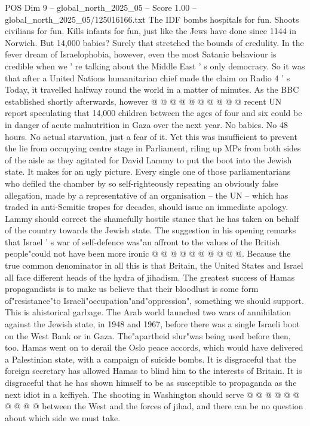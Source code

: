 \begin{textsample}{POS Dim 9 – global\_north\_2025\_05 – Score 1.00 – global\_north\_2025\_05/125016166.txt}
The IDF bombs hospitals for fun.
Shoots civilians for fun.
Kills infants for fun, just like the Jews have done since 1144 in Norwich.
But 14,000 babies?
Surely that stretched the bounds of credulity.
In the fever dream of Israelophobia, however, even the most Satanic behaviour is credible when we ' re talking about the Middle East ' s only democracy.
So it was that after a United Nations humanitarian chief made the claim on Radio 4 ' s Today, it travelled halfway round the world in a matter of minutes.
As the BBC established shortly afterwards, however @ @ @ @ @ @ @ @ @ @ recent UN report speculating that 14,000 children between the ages of four and six could be in danger of acute malnutrition in Gaza over the next year.
No babies.
No 48 hours.
No actual starvation, just a fear of it.
Yet this was insufficient to prevent the lie from occupying centre stage in Parliament, riling up MPs from both sides of the aisle as they agitated for David Lammy to put the boot into the Jewish state.
It makes for an ugly picture.
Every single one of those parliamentarians who defiled the chamber by so self-righteously repeating an obviously false allegation, made by a representative of an organisation -- the UN -- which has traded in anti-Semitic tropes for decades, should issue an immediate apology.
Lammy should correct the shamefully hostile stance that he has taken on behalf of the country towards the Jewish state.
The suggestion in his opening remarks that Israel ' s war of self-defence was"an affront to the values of the British people"could not have been more ironic @ @ @ @ @ @ @ @ @ @.
Because the true common denominator in all this is that Britain, the United States and Israel all face different heads of the hydra of jihadism.
The greatest success of Hamas propagandists is to make us believe that their bloodlust is some form of"resistance"to Israeli"occupation"and"oppression", something we should support.
This is ahistorical garbage.
The Arab world launched two wars of annihilation against the Jewish state, in 1948 and 1967, before there was a single Israeli boot on the West Bank or in Gaza.
The"apartheid slur"was being used before then, too.
Hamas went on to derail the Oslo peace accords, which would have delivered a Palestinian state, with a campaign of suicide bombs.
It is disgraceful that the foreign secretary has allowed Hamas to blind him to the interests of Britain.
It is disgraceful that he has shown himself to be as susceptible to propaganda as the next idiot in a keffiyeh.
The shooting in Washington should serve @ @ @ @ @ @ @ @ @ @ between the West and the forces of jihad, and there can be no question about which side we must take.

\end{textsample}
